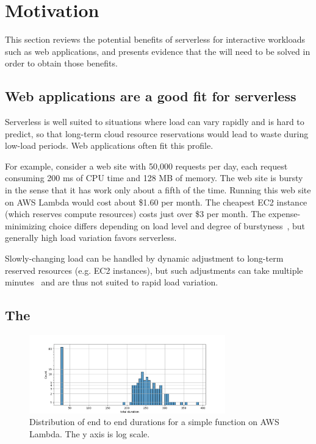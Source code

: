 \section{Motivation}\label{motivation}

This section reviews the potential benefits of serverless for
interactive workloads such as web applications, and presents
evidence that the {\problem} will need to be solved in order to
obtain those benefits.

\subsection{Web applications are a good fit for serverless}

Serverless is well suited to situations where load can vary rapidly
and is hard to predict, so that long-term cloud resource reservations
would lead to waste during low-load periods. Web applications often
fit this profile.

For example, consider a web site with 50,000 requests per day, each
request consuming 200 ms of CPU time and 128 MB of memory. The web
site is bursty in the sense that it has work only about a fifth of the
time. Running this web site on AWS Lambda would cost about \$1.60 per
month. The cheapest EC2 instance (which reserves compute resources)
costs just over \$3 per month. The expense-minimizing choice differs
depending on load level and degree of
burstyness~\cite{econ-of-serverless,trek10-blog},
but generally high load variation favors serverless.

Slowly-changing load can be handled by dynamic adjustment to long-term
reserved resources (e.g. EC2 instances), but such adjustments can take
multiple minutes~\cite{ec2-autoscaling} and are thus not suited to
rapid load variation.

\subsection{The \problem{}}


\begin{figure}[t!]
    \centering
      \includegraphics[width=8.5cm]{img/lambda_total_durations.png}
      \caption{Distribution of end to end durations for a simple function on AWS Lambda. The y axis is log scale. }
    \label{fig:lambda-total-durations}
\end{figure}

